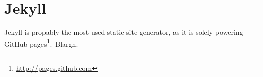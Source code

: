 \section{Jekyll}
\label{sec:jekyll}

Jekyll is propably the most used static site generator, as it is solely powering GitHub pages\footnote{\url{http://pages.github.com}}.\
Blargh.
